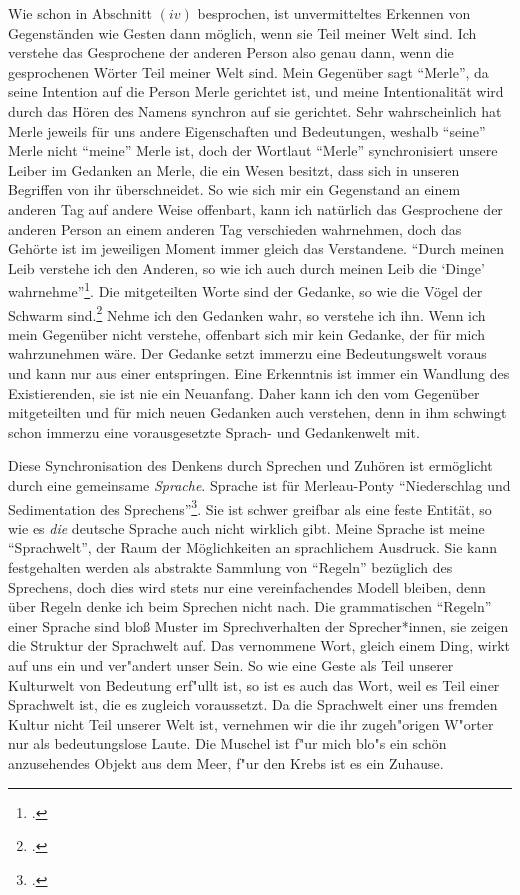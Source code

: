\documentclass[a4paper, 12pt]{article}
\begin{document}
\begin{onehalfspace}
Wie schon in Abschnitt $(iv)$ besprochen, ist unvermitteltes Erkennen von Gegenständen wie Gesten dann möglich, wenn sie Teil meiner Welt sind. Ich verstehe das Gesprochene der anderen Person also genau dann, wenn die gesprochenen Wörter Teil meiner Welt sind. Mein Gegenüber sagt "`Merle"', da seine Intention auf die Person Merle gerichtet ist, und meine Intentionalität wird durch das Hören des Namens synchron auf sie gerichtet. Sehr wahrscheinlich hat Merle jeweils für uns andere Eigenschaften und Bedeutungen, weshalb "`seine"' Merle nicht "`meine"' Merle ist, doch der Wortlaut "`Merle"' synchronisiert unsere Leiber im Gedanken an Merle, die ein Wesen besitzt, dass sich in unseren Begriffen von ihr überschneidet. So wie sich mir ein Gegenstand an einem anderen Tag auf andere Weise offenbart, kann ich natürlich das Gesprochene der anderen Person an einem anderen Tag verschieden wahrnehmen, doch das Gehörte ist im jeweiligen Moment immer gleich das Verstandene. "`Durch meinen Leib verstehe ich den Anderen, so wie ich auch durch meinen Leib die `Dinge' wahrnehme"'\footnote{\Cite[Siehe][S. 220]{merleau1966phanomenologie}.}. Die mitgeteilten Worte sind der Gedanke, so wie die Vögel der Schwarm sind.\footnote{\Cite[Vgl.][S. 217]{merleau1966phanomenologie}.} Nehme ich den Gedanken wahr, so verstehe ich ihn. Wenn ich mein Gegenüber nicht verstehe, offenbart sich mir kein Gedanke, der für mich wahrzunehmen wäre. Der Gedanke setzt immerzu eine Bedeutungswelt voraus und kann nur aus einer entspringen. Eine Erkenntnis ist immer ein Wandlung des Existierenden, sie ist nie ein Neuanfang. Daher kann ich den vom Gegenüber mitgeteilten und für mich neuen Gedanken auch verstehen, denn in ihm schwingt schon immerzu eine vorausgesetzte Sprach- und Gedankenwelt mit. 

Diese Synchronisation des Denkens durch Sprechen und Zuhören ist ermöglicht durch eine gemeinsame \emph{Sprache}. Sprache ist für Merleau-Ponty "`Niederschlag und Sedimentation des Sprechens"'\footnote{\Cite[Siehe][S. 232]{merleau1966phanomenologie}.}. Sie ist schwer greifbar als eine feste Entität, so wie es \emph{die} deutsche Sprache auch nicht wirklich gibt. Meine Sprache ist meine "`Sprachwelt"', der Raum der Möglichkeiten an sprachlichem Ausdruck. Sie kann festgehalten werden als abstrakte Sammlung von "`Regeln"' bezüglich des Sprechens, doch dies wird stets nur eine vereinfachendes Modell bleiben, denn über Regeln denke ich beim Sprechen nicht nach. Die grammatischen "`Regeln"' einer Sprache sind bloß Muster im Sprechverhalten der Sprecher*innen, sie zeigen die Struktur der Sprachwelt auf. Das vernommene Wort, gleich einem Ding, wirkt auf uns ein und ver"andert unser Sein. So wie eine Geste als Teil unserer Kulturwelt von Bedeutung erf"ullt ist, so ist es auch das Wort, weil es Teil einer Sprachwelt ist, die es zugleich voraussetzt. Da die Sprachwelt einer uns fremden Kultur nicht Teil unserer Welt ist, vernehmen wir die ihr zugeh"origen W"orter nur als bedeutungslose Laute. Die Muschel ist f"ur mich blo"s ein schön anzusehendes Objekt aus dem Meer, f"ur den Krebs ist es ein Zuhause. 


\end{onehalfspace}
\end{document}
